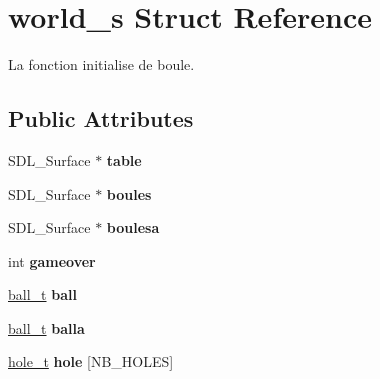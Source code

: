 \hypertarget{structworld__s}{\section{world\-\_\-s Struct Reference}
\label{structworld__s}
}


La fonction initialise de boule.  


\subsection*{Public Attributes}
\begin{DoxyCompactItemize}
\item 
\hypertarget{structworld__s_aa9646dfaffa5e0b1cbf60d9eae003913}{S\-D\-L\-\_\-\-Surface $\ast$ {\bfseries table}}\label{structworld__s_aa9646dfaffa5e0b1cbf60d9eae003913}

\item 
\hypertarget{structworld__s_add1490be2b8a68c98a84acdfdcc8c09e}{S\-D\-L\-\_\-\-Surface $\ast$ {\bfseries boules}}\label{structworld__s_add1490be2b8a68c98a84acdfdcc8c09e}

\item 
\hypertarget{structworld__s_adb74c257758812f9d7830e4bcd98e6f6}{S\-D\-L\-\_\-\-Surface $\ast$ {\bfseries boulesa}}\label{structworld__s_adb74c257758812f9d7830e4bcd98e6f6}

\item 
\hypertarget{structworld__s_a693aa82d082fe3467969094559b9bc0f}{int {\bfseries gameover}}\label{structworld__s_a693aa82d082fe3467969094559b9bc0f}

\item 
\hypertarget{structworld__s_a6089e88edc1e689bdc177d6867d1310f}{\hyperlink{structball__s}{ball\-\_\-t} {\bfseries ball}}\label{structworld__s_a6089e88edc1e689bdc177d6867d1310f}

\item 
\hypertarget{structworld__s_ac5e9581cbd60a9a9455af0d48a8ed7f5}{\hyperlink{structball__s}{ball\-\_\-t} {\bfseries balla}}\label{structworld__s_ac5e9581cbd60a9a9455af0d48a8ed7f5}

\item 
\hypertarget{structworld__s_a3375c7fd4eba065fdc9f81e7ef1d7eb9}{\hyperlink{structhole__s}{hole\-\_\-t} {\bfseries hole} \mbox{[}N\-B\-\_\-\-H\-O\-L\-E\-S\mbox{]}}\label{structworld__s_a3375c7fd4eba065fdc9f81e7ef1d7eb9}

\end{DoxyCompactItemize}


